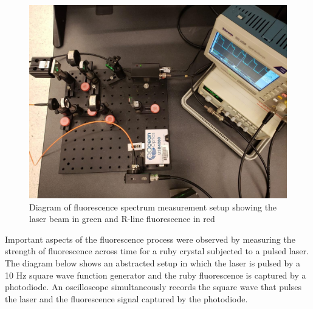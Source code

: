 \documentclass[11pt, a4paper, twocolumn]{article}
\begin{document}
\begin{figure}[H]
\includegraphics[width=\linewidth, height=\linewidth]{laserBenchPhoto.png}
\caption{Diagram of fluorescence spectrum measurement setup showing the laser beam in green and R-line fluorescence in red
}
\label{fig:intensities}
\end{figure}

Important aspects of the fluorescence process were observed by measuring the strength of fluorescence across time for a ruby crystal subjected to a pulsed laser. The diagram below shows an abstracted setup in which the laser is pulsed by a 10 Hz square wave function generator and the ruby fluorescence is captured by a photodiode. An oscilloscope simultaneously records the square wave that pulses the laser and the fluorescence signal captured by the photodiode.
\end{document}
